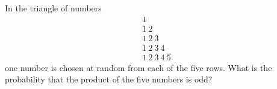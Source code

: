 In the triangle of numbers
\[
\begin{array}{l}1\\1\ 2\\1\ 2\ 3\\1\ 2\ 3\ 4\\1\ 2\ 3\ 4\ 5\end{array}
\]
one number is chosen at random from each of the five rows. What is the probability that the product of the five numbers is odd?
